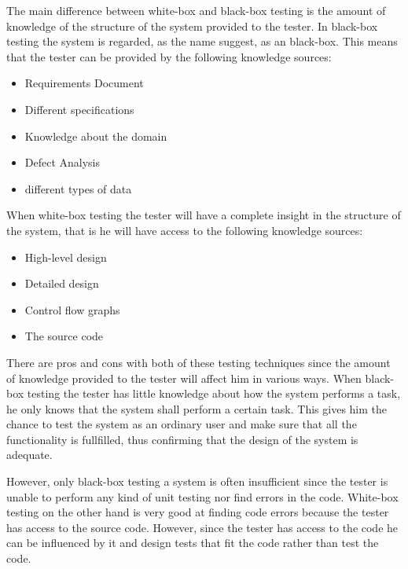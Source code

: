 The main difference between white-box and black-box testing is the amount of knowledge of the structure of the system provided to the tester. In black-box testing the system is regarded, as the name suggest, as an black-box. This means that the tester can be provided by the following knowledge sources:
\begin{itemize}
	\item Requirements Document
	\item Different specifications
	\item Knowledge about the domain
	\item Defect Analysis
	\item different types of data
\end{itemize}

\noindent When white-box testing the tester will have a complete insight in the structure of the system, that is he will have access to the following knowledge sources:
\begin{itemize}
	\item High-level design
	\item Detailed design
	\item Control flow graphs
	\item The source code
\end{itemize}

\noindent There are pros and cons with both of these testing techniques since the amount of knowledge provided to the tester will affect him in various ways. When black-box testing the tester has little knowledge about how the system performs a task,  he only knows that the system shall perform a certain task. This gives him the chance to test the system as an ordinary user and make sure that all the functionality is fullfilled, thus confirming that the design of the system is adequate. 

However, only black-box testing a system is often insufficient since the tester is unable to perform any kind of unit testing nor find errors in the code.
White-box testing on the other hand is very good at finding code errors because the tester has access to the source code. However, since the tester has access to the code he can be influenced by it and design tests that fit the code rather than test the code.